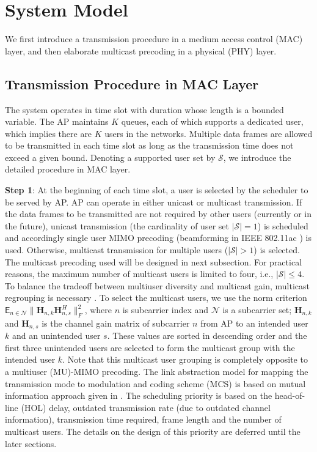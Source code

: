 \documentclass[conference]{IEEEtran}
\newcommand{\mat}[1]{{\mathbf{#1}}}
\newcommand{\0}{\vect{0}}
\newcommand{\1}{\vect{1}}
\renewcommand{\H}{\mat{H}}
\begin{document}
\section{System Model} \label{sec:sys}

We first introduce a transmission procedure in a medium access control (MAC) layer, and then elaborate multicast precoding in a physical (PHY) layer.

\subsection{Transmission Procedure in MAC Layer}
The system operates in time slot with duration whose length is a bounded variable. The AP maintains $K$ queues, each of which supports a dedicated user, which implies there are $K$ users in the networks. Multiple data frames are allowed to be transmitted in each time slot as long as the transmission time does not exceed a given bound. Denoting a supported user set by $\mathcal{S}$, we introduce the detailed procedure in MAC layer.

{\bf Step 1}: At the beginning of each time slot, a user is selected by the scheduler to be served by AP. AP can operate in either unicast or multicast transmission. If the data frames to be transmitted are not required by other users (currently or in the future), unicast transmission (the cardinality of user set $|\mathcal{S}|=1$) is scheduled and accordingly single user MIMO precoding (beamforming in IEEE 802.11ac \cite{IEEE13AC}) is used. Otherwise, multicast transmission for multiple users ($|\mathcal{S}|>1$) is selected. The multicast precoding used will be designed in next subsection. For practical reasons, the maximum number of multicast users is limited to four, i.e., $|\mathcal{S}|\leq 4$. To balance the tradeoff between multiuser diversity and multicast gain, multicast regrouping is necessary \cite{Low10WC,Tsa11WC}. To select the multicast users, we use the norm criterion $\mathsf{E}_{n\in \mathcal{N}}\|\H_{n,k} \H_{n,s}^H\|_F^2$, where $n$ is subcarrier index and $\mathcal{N}$ is a subcarrier set; $\H_{n,k}$ and $\H_{n,s}$ is the channel gain matrix of subcarrier $n$ from AP to an intended user $k$ and an unintended user $s$. These values are sorted in descending order and the first three unintended users are selected to form the multicast group with the intended user $k$. Note that this multicast user grouping  is completely opposite to a multiuser (MU)-MIMO precoding. The link abstraction model for mapping the transmission mode to modulation and coding scheme (MCS) is based on mutual information approach given in \cite{Tan08JSAC}.
The scheduling priority is based on the head-of-line (HOL) delay, outdated transmission rate (due to outdated channel information), transmission  time required, frame length and the number of multicast users. The details on the design of this priority are deferred until the later sections.
\end{document}
